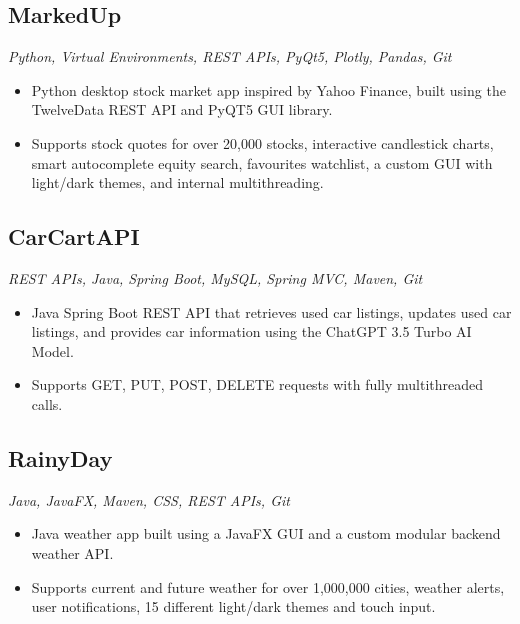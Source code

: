 \documentclass[10pt, a4paper]{article}
\begin{document}
\subsection*{MarkedUp }
\textit{Python, Virtual Environments, REST APIs, PyQt5, Plotly, Pandas, Git}
\begin{itemize}
    \item Python desktop stock market app inspired by Yahoo Finance, built using the TwelveData REST API and PyQT5 GUI library.
    \item Supports stock quotes for over 20,000 stocks, interactive candlestick charts, smart autocomplete equity search, favourites watchlist, a custom GUI with light/dark themes, and internal multithreading.
\end{itemize}

\subsection*{CarCartAPI }
\textit{REST APIs, Java, Spring Boot, MySQL, Spring MVC, Maven, Git}
\begin{itemize}
    \item Java Spring Boot REST API that retrieves used car listings, updates used car listings, and provides car information using the ChatGPT 3.5 Turbo AI Model.
    \item Supports GET, PUT, POST, DELETE requests with fully multithreaded calls.
\end{itemize}

\subsection*{RainyDay }
\textit{Java, JavaFX, Maven, CSS, REST APIs, Git}
\begin{itemize}
    \item Java weather app built using a JavaFX GUI and a custom modular backend weather API.
    \item Supports current and future weather for over 1,000,000 cities, weather alerts, user notifications, 15 different light/dark themes and touch input.
\end{itemize}
\end{document}
